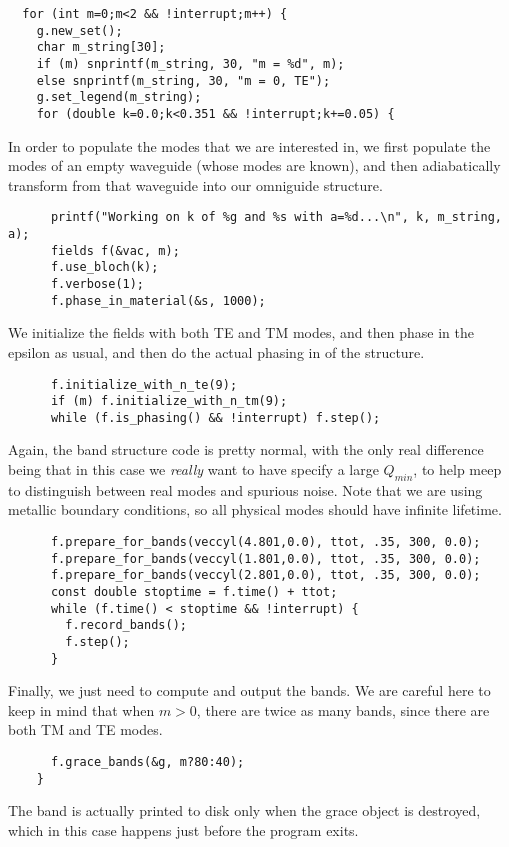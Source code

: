 \begin{verbatim}
  for (int m=0;m<2 && !interrupt;m++) {
    g.new_set();
    char m_string[30];
    if (m) snprintf(m_string, 30, "m = %d", m);
    else snprintf(m_string, 30, "m = 0, TE");
    g.set_legend(m_string);
    for (double k=0.0;k<0.351 && !interrupt;k+=0.05) {
\end{verbatim}
In order to populate the modes that we are interested in, we first populate
the modes of an empty waveguide (whose modes are known), and then
adiabatically transform from that waveguide into our omniguide structure.
\begin{verbatim}
      printf("Working on k of %g and %s with a=%d...\n", k, m_string, a);
      fields f(&vac, m);
      f.use_bloch(k);
      f.verbose(1);
      f.phase_in_material(&s, 1000);
\end{verbatim}
We initialize the fields with both TE and TM modes, and then phase in the
epsilon as usual, and then do the actual phasing in of the structure.
\begin{verbatim}
      f.initialize_with_n_te(9);
      if (m) f.initialize_with_n_tm(9);
      while (f.is_phasing() && !interrupt) f.step();
\end{verbatim}
Again, the band structure code is pretty normal, with the only real
difference being that in this case we \emph{really} want to have specify a
large $Q_{min}$, to help meep to distinguish between real modes and
spurious noise.  Note that we are using metallic boundary conditions, so
all physical modes should have infinite lifetime.
\begin{verbatim}
      f.prepare_for_bands(veccyl(4.801,0.0), ttot, .35, 300, 0.0);
      f.prepare_for_bands(veccyl(1.801,0.0), ttot, .35, 300, 0.0);
      f.prepare_for_bands(veccyl(2.801,0.0), ttot, .35, 300, 0.0);
      const double stoptime = f.time() + ttot;
      while (f.time() < stoptime && !interrupt) {
        f.record_bands();
        f.step();
      }
\end{verbatim}
Finally, we just need to compute and output the bands.  We are careful here
to keep in mind that when $m > 0$, there are twice as many bands, since
there are both TM and TE modes.
\begin{verbatim}
      f.grace_bands(&g, m?80:40);
    }
\end{verbatim}
The band is actually printed to disk only when the grace object is
destroyed, which in this case happens just before the program exits.
\begin{comment}
  }
}
\end{comment}